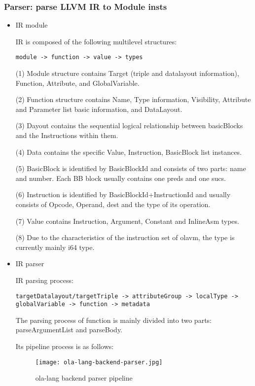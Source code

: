 \subsubsection{Parser: parse LLVM IR to Module insts}

    \begin{itemize}
        \item IR module

IR is composed of the following multilevel structures:
\begin{lstlisting}[language={}]
module -> function -> value -> types
\end{lstlisting}

(1) Module structure contains Target (triple and datalayout information), Function, Attribute, and GlobalVariable.

(2) Function structure contains Name, Type information, Visibility, Attribute and Parameter list basic information, and DataLayout.

(3) Dayout contains the sequential logical relationship between basicBlocks and the Instructions within them.

(4) Data contains the specific Value, Instruction, BasicBlock list instances.

(5) BasicBlock is identified by BasicBlockId and consists of two parts: name and number. Each BB block usually contains one preds and one sucs.

(6) Instruction is identified by BasicBlockId+InstructionId and usually consists of Opcode, Operand, dest and the type of its operation.

(7) Value contains Instruction, Argument, Constant and InlineAsm types.

(8) Due to the characteristics of the instruction set of olavm, the type is currently mainly i64 type.

        \item IR parser

IR parsing process:
\begin{lstlisting}[language={}]
targetDatalayout/targetTriple -> attributeGroup -> localType ->
globalVariable -> function -> metadata
\end{lstlisting}

The parsing process of function is mainly divided into two parts: parseArgumentList and parseBody.

Its pipeline process is as follows:
\begin{figure}[!htbp]
    \centering
    \texttt{[image: ola-lang-backend-parser.jpg]}
    \caption{ola-lang backend parser pipeline}
    \label{fig:ola-lang-backend-parser}
\end{figure}
\end{itemize}
